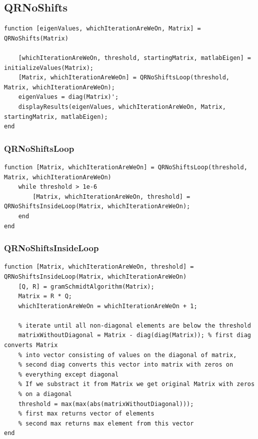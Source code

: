 \subsection{QRNoShifts}
\begin{simplechar}
\begin{lstlisting}
function [eigenValues, whichIterationAreWeOn, Matrix] = QRNoShifts(Matrix)

    [whichIterationAreWeOn, threshold, startingMatrix, matlabEigen] = initializeValues(Matrix);
    [Matrix, whichIterationAreWeOn] = QRNoShiftsLoop(threshold, Matrix, whichIterationAreWeOn);
    eigenValues = diag(Matrix)';
    displayResults(eigenValues, whichIterationAreWeOn, Matrix, startingMatrix, matlabEigen);
end
\end{lstlisting}
\end{simplechar}

\newpage
\subsubsection{QRNoShiftsLoop}
\begin{simplechar}
\begin{lstlisting}
function [Matrix, whichIterationAreWeOn] = QRNoShiftsLoop(threshold, Matrix, whichIterationAreWeOn)
    while threshold > 1e-6
        [Matrix, whichIterationAreWeOn, threshold] = QRNoShiftsInsideLoop(Matrix, whichIterationAreWeOn);
    end
end
\end{lstlisting}
\end{simplechar}

\subsubsection{QRNoShiftsInsideLoop}
\begin{simplechar}
\begin{lstlisting}
function [Matrix, whichIterationAreWeOn, threshold] = QRNoShiftsInsideLoop(Matrix, whichIterationAreWeOn)
    [Q, R] = gramSchmidtAlgorithm(Matrix);
    Matrix = R * Q;
    whichIterationAreWeOn = whichIterationAreWeOn + 1;

    % iterate until all non-diagonal elements are below the threshold
    matrixWithoutDiagonal = Matrix - diag(diag(Matrix)); % first diag converts Matrix
    % into vector consisting of values on the diagonal of matrix,
    % second diag converts this vector into matrix with zeros on
    % everything except diagonal
    % If we substract it from Matrix we get original Matrix with zeros
    % on a diagonal
    threshold = max(max(abs(matrixWithoutDiagonal)));
    % first max returns vector of elements
    % second max returns max element from this vector
end
\end{lstlisting}
\end{simplechar}

